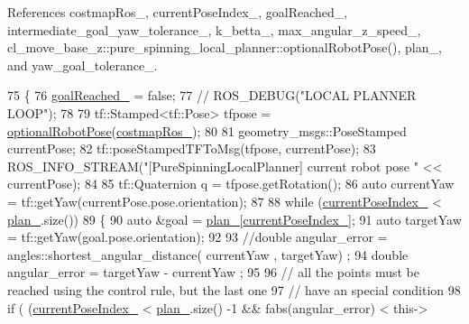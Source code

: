 References costmap\+Ros\+\_\+, current\+Pose\+Index\+\_\+, goal\+Reached\+\_\+, intermediate\+\_\+goal\+\_\+yaw\+\_\+tolerance\+\_\+, k\+\_\+betta\+\_\+, max\+\_\+angular\+\_\+z\+\_\+speed\+\_\+, cl\+\_\+move\+\_\+base\+\_\+z\+::pure\+\_\+spinning\+\_\+local\+\_\+planner\+::optional\+Robot\+Pose(), plan\+\_\+, and yaw\+\_\+goal\+\_\+tolerance\+\_\+.


\begin{DoxyCode}
75 \{
76   \hyperlink{classcl__move__base__z_1_1pure__spinning__local__planner_1_1PureSpinningLocalPlanner_aecfe0dfc68b8c8e461e8b684e5fa4d2f}{goalReached\_} = \textcolor{keyword}{false};
77   \textcolor{comment}{// ROS\_DEBUG("LOCAL PLANNER LOOP");}
78 
79   tf::Stamped<tf::Pose> tfpose = \hyperlink{namespacecl__move__base__z_1_1pure__spinning__local__planner_a6ae763fceb009e0c477171fefe74b4fc}{optionalRobotPose}(\hyperlink{classcl__move__base__z_1_1pure__spinning__local__planner_1_1PureSpinningLocalPlanner_a63f75481071df118d56e8b652e68b002}{costmapRos\_});
80 
81   geometry\_msgs::PoseStamped currentPose;
82   tf::poseStampedTFToMsg(tfpose, currentPose);
83   ROS\_INFO\_STREAM(\textcolor{stringliteral}{"[PureSpinningLocalPlanner] current robot pose "} << currentPose);
84 
85   tf::Quaternion q = tfpose.getRotation();
86   \textcolor{keyword}{auto} currentYaw = tf::getYaw(currentPose.pose.orientation);
87 
88   \textcolor{keywordflow}{while} (\hyperlink{classcl__move__base__z_1_1pure__spinning__local__planner_1_1PureSpinningLocalPlanner_aa0f9b4cf52a76e44dc2cfc5103d52dcd}{currentPoseIndex\_} < \hyperlink{classcl__move__base__z_1_1pure__spinning__local__planner_1_1PureSpinningLocalPlanner_a31875ee78bae4698b579e20c0754860d}{plan\_}.size())
89   \{
90     \textcolor{keyword}{auto} &goal = \hyperlink{classcl__move__base__z_1_1pure__spinning__local__planner_1_1PureSpinningLocalPlanner_a31875ee78bae4698b579e20c0754860d}{plan\_}[\hyperlink{classcl__move__base__z_1_1pure__spinning__local__planner_1_1PureSpinningLocalPlanner_aa0f9b4cf52a76e44dc2cfc5103d52dcd}{currentPoseIndex\_}];
91     \textcolor{keyword}{auto} targetYaw = tf::getYaw(goal.pose.orientation);
92 
93     \textcolor{comment}{//double angular\_error = angles::shortest\_angular\_distance( currentYaw , targetYaw) ; }
94     \textcolor{keywordtype}{double} angular\_error = targetYaw - currentYaw ;
95 
96     \textcolor{comment}{// all the points must be reached using the control rule, but the last one}
97     \textcolor{comment}{// have an special condition}
98     \textcolor{keywordflow}{if} ( (\hyperlink{classcl__move__base__z_1_1pure__spinning__local__planner_1_1PureSpinningLocalPlanner_aa0f9b4cf52a76e44dc2cfc5103d52dcd}{currentPoseIndex\_} < \hyperlink{classcl__move__base__z_1_1pure__spinning__local__planner_1_1PureSpinningLocalPlanner_a31875ee78bae4698b579e20c0754860d}{plan\_}.size() -1 && fabs(angular\_error) < this->

\end{DoxyCode}
